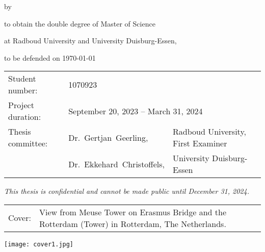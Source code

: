 \begin{titlepage}

\begin{center}

{\makeatletter
\largetitlestyle\fontsize{40}{40}\selectfont\@title
\makeatother}

{\makeatletter
\ifdefvoid{\@subtitle}{}{\bigskip\titlestyle\fontsize{20}{20}\selectfont\@subtitle}
\makeatother}

\bigskip
\bigskip

by

\bigskip
\bigskip

{\makeatletter
\largetitlestyle\fontsize{20}{20}\selectfont\@author
\makeatother}

\bigskip
\bigskip

to obtain the double degree of Master of Science

at Radboud University and University Duisburg-Essen,

to be defended on {\today}

\vfill

\begin{tabular}{lll}
    Student number: & 1070923 \\
    Project duration: & \multicolumn{2}{l}{September 20, 2023 -- March 31, 2024} \\
    Thesis committee: & Dr.\ Gertjan\ Geerling, & Radboud University, First Examiner \\
        & Dr.\ Ekkehard\ Christoffels, & University Duisburg-Essen \\
   
\end{tabular}

\bigskip
\bigskip
\emph{This thesis is confidential and cannot be made public until December 31, 2024.}

\bigskip
\bigskip
\begin{tabular}{p{15mm}p{10cm}}
    Cover: & View from Meuse Tower on Erasmus Bridge and the Rotterdam (Tower) in Rotterdam, The Netherlands. \\
\end{tabular}

\bigskip
\bigskip


\end{center}

\texttt{[image: cover1.jpg]}

\end{titlepage}
